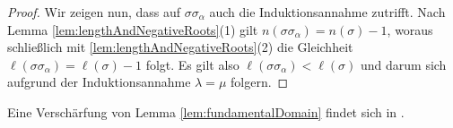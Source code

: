 \begin{proof}
  Wir zeigen nun, dass auf $\sigma \sigma_\alpha$ auch die Induktionsannahme zutrifft.
  Nach Lemma \ref{lem:lengthAndNegativeRoots}(1) gilt $n(\sigma\sigma_\alpha) = n(\sigma) - 1$, woraus schließlich mit \ref{lem:lengthAndNegativeRoots}(2) die Gleichheit $\ell(\sigma\sigma_\alpha) = \ell(\sigma) - 1$ folgt.
  Es gilt also $\ell(\sigma\sigma_\alpha) < \ell(\sigma)$ und darum sich aufgrund der Induktionsannahme $\lambda = \mu$ folgern.
\end{proof}
 
Eine Verschärfung von Lemma \ref{lem:fundamentalDomain} findet sich in \cite[S.22]{humphreys1992reflection}.
